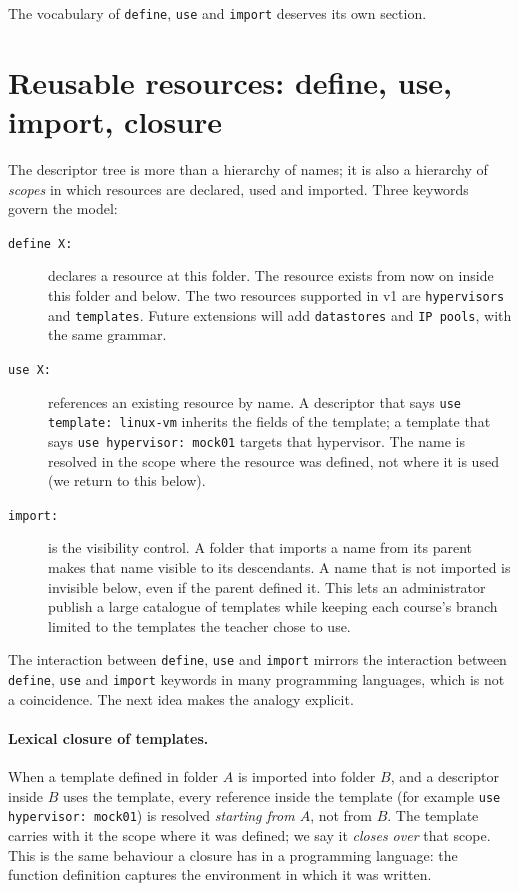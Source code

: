The vocabulary of \texttt{define}, \texttt{use} and \texttt{import}
deserves its own section.

\section{Reusable resources: define, use, import, closure}
\label{sec:define-use-import}

The descriptor tree is more than a hierarchy of names; it is also a
hierarchy of \emph{scopes} in which resources are declared, used and
imported. Three keywords govern the model:

\begin{description}
  \item[\texttt{define X:}] declares a resource at this folder. The
        resource exists from now on inside this folder and below.
        The two resources supported in v1 are \texttt{hypervisors}
        and \texttt{templates}. Future extensions will add
        \texttt{datastores} and \texttt{IP pools}, with the same
        grammar.
  \item[\texttt{use X:}] references an existing resource by name. A
        descriptor that says \texttt{use template: linux-vm}
        inherits the fields of the template; a template that says
        \texttt{use hypervisor: mock01} targets that hypervisor.
        The name is resolved in the scope where the resource was
        defined, not where it is used (we return to this below).
  \item[\texttt{import:}] is the visibility control. A folder that
        imports a name from its parent makes that name visible to
        its descendants. A name that is not imported is invisible
        below, even if the parent defined it. This lets an
        administrator publish a large catalogue of templates while
        keeping each course's branch limited to the templates the
        teacher chose to use.
\end{description}

The interaction between \texttt{define}, \texttt{use} and
\texttt{import} mirrors the interaction between
\texttt{define}, \texttt{use} and \texttt{import} keywords in many
programming languages, which is not a coincidence. The next idea
makes the analogy explicit.

\paragraph{Lexical closure of templates.}
When a template defined in folder $A$ is imported into folder $B$,
and a descriptor inside $B$ uses the template, every reference
inside the template (for example \texttt{use hypervisor: mock01})
is resolved \emph{starting from $A$}, not from $B$. The template
carries with it the scope where it was defined; we say it
\emph{closes over} that scope. This is the same behaviour a closure
has in a programming language: the function definition captures the
environment in which it was written.

